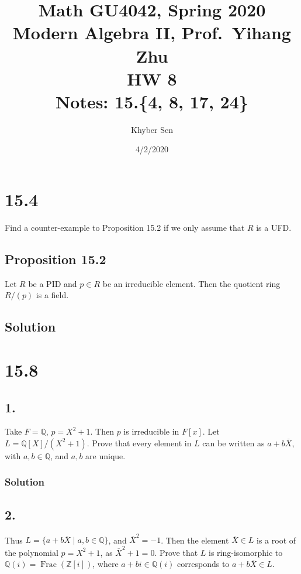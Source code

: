 \documentclass[fleqn]{article}
\title{
Math GU4042, Spring 2020 \\
Modern Algebra II, Prof.\ Yihang Zhu \\
HW 8 \\
Notes: 15.\{4, 8, 17, 24\} \\
}
\author{Khyber Sen}
\date{4/2/2020}
\DeclareMathOperator{\Frac}{Frac}
\begin{document}
    
    \maketitle
    
    \section{15.4}
    Find a counter-example to Proposition 15.2 if we only assume that $R$ is a UFD.
        
        \subsection{Proposition 15.2}
        Let $R$ be a PID and $p \in R$ be an irreducible element.  Then the quotient ring $R/(p)$ is a field.
        
        \subsection{Solution}
        
    
    
    \section{15.8}
        
        \subsection{1.}
        Take $F = \mathbb{Q}$, $p = X^2 + 1$.  Then $p$ is irreducible in $F[x]$.  Let $L = \mathbb{Q}[X]/(X^2 + 1)$.  Prove that every element in $L$ can be written as $a + b\overline{X}$, with $a, b \in \mathbb{Q}$, and $a, b$ are unique.
            
            \subsubsection{Solution}
            
        
        \subsection{2.}
        Thus $L = \{a + b\overline{X} \mid a, b \in \mathbb{Q}\}$, and $\overline{X}^2 = -1$.  Then the element $\overline{X} \in L$ is a root of the polynomial $p = X^2 + 1$, as $\overline{X}^2 + 1 = 0$.  Prove that $L$ is ring-isomorphic to $\mathbb{Q}(i) = \Frac(\mathbb{Z}[i])$, where $a + bi \in \mathbb{Q}(i)$ corresponds to $a + b\overline{X} \in L$.
        
\end{document}
